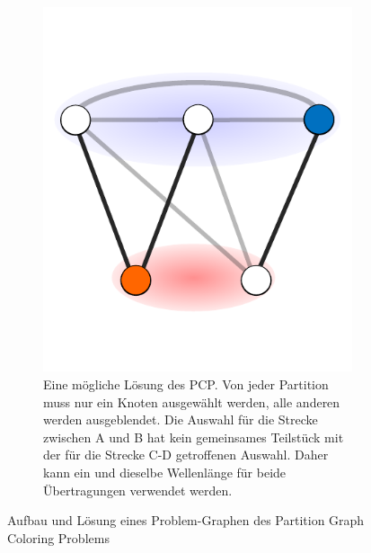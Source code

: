 \begin{figure}
\begin{subfigure}[t]{0.3\textwidth}
		\includegraphics[width=\textwidth]{img/bsp5}
		\caption{Eine mögliche Lösung des PCP\@. Von jeder Partition muss nur ein Knoten ausgewählt werden, alle anderen werden ausgeblendet. Die Auswahl für die Strecke zwischen A und B hat kein gemeinsames Teilstück mit der für die Strecke C-D getroffenen Auswahl. Daher kann ein und dieselbe Wellenlänge für beide Übertragungen verwendet werden.}
		\label{fig:example:e}
	\end{subfigure}
	
	\caption{Aufbau und Lösung eines Problem-Graphen des Partition Graph Coloring Problems}
\end{figure}

